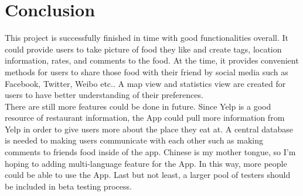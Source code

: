 \chapter{Conclusion}

This project is successfully finished in time with good functionalities overall. It could provide users to take picture of food they like and create tags, location information, rates, and comments to the food. At the time, it provides convenient methods for users to share those food with their friend by social media such as Facebook, Twitter, Weibo etc.. A map view and statistics view are created for users to have better understanding of their preferences. \\

There are still more features could be done in future. Since Yelp is a good resource of restaurant information, the App could pull more information from Yelp in order to give users more about the place they eat at. A central database is needed to making users communicate with each other such as making comments to friends food inside of the app. Chinese is my mother tongue, so I'm hoping to adding multi-language feature for the App. In this way, more people could be able to use the App. Last but not least, a larger pool of testers should be included in beta testing process.
